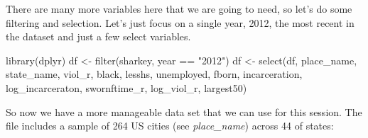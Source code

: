 \documentclass[
]{book}
\newenvironment{Shaded}{\begin{snugshade}}{\end{snugshade}}
\newcommand{\FunctionTok}[1]{\textcolor[rgb]{0.00,0.00,0.00}{#1}}
\newcommand{\NormalTok}[1]{#1}
\newcommand{\OtherTok}[1]{\textcolor[rgb]{0.56,0.35,0.01}{#1}}
\newcommand{\SpecialCharTok}[1]{\textcolor[rgb]{0.00,0.00,0.00}{#1}}
\newcommand{\StringTok}[1]{\textcolor[rgb]{0.31,0.60,0.02}{#1}}
\begin{document}
There are many more variables here that we are going to need, so let's do some filtering and selection. Let's just focus on a single year, 2012, the most recent in the dataset and just a few select variables.

\begin{Shaded}
\begin{Highlighting}[]
\FunctionTok{library}\NormalTok{(dplyr)}
\NormalTok{df }\OtherTok{\textless{}{-}} \FunctionTok{filter}\NormalTok{(sharkey, year }\SpecialCharTok{==} \StringTok{"2012"}\NormalTok{)}
\NormalTok{df }\OtherTok{\textless{}{-}} \FunctionTok{select}\NormalTok{(df, place\_name, state\_name, viol\_r, black, lesshs, unemployed, fborn, incarceration, log\_incarceraton, swornftime\_r, log\_viol\_r, largest50)}
\end{Highlighting}
\end{Shaded}

So now we have a more manageable data set that we can use for this session. The file includes a sample of 264 US cities (see \emph{place\_name}) across 44 of states:

\begin{Shaded}
\end{Shaded}
\end{document}
